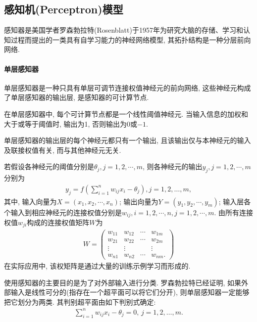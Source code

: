 \subsection{感知机(Perceptron)模型}
    感知器是美国学者罗森勃拉特(Rosenblatt)于1957年为研究大脑的存储、学习和认知过程而提出的一类具有自学习能力的神经网络模型, 其拓扑结构是一种分层前向网络.
\paragraph{单层感知器}
单层感知器是一种只具有单层可调节连接权值神经元的前向网络, 这些神经元构成了单层感知器的输出层, 是感知器的可计算节点.

在单层感知器中, 每个可计算节点都是一个线性阈值神经元. 当输入信息的加权和大于或等于阈值时, 输出为1, 否则输出为0或$-1$.

单层感知器的输出层的每个神经元都只有一个输出, 且该输出仅与本神经元的输入及联接权值有关, 而与其他神经元无关.

若假设各神经元的阈值分别是$\theta_j, j=1,2,\cdots,m$, 则各神经元的输出$y_j, j=1,2,\cdots,m$分别为
\begin{align}
    {y}_{{j}}={f}\left(\sum_{{i}=1}^{{n}} w_{{ij}} {x}_{{i}}-\theta_{{j}}\right), {j}=1,2, \ldots, {m},
\end{align}
其中, 输入向量为$X=(x_1,x_2,\cdots,x_n)$; 输出向量为$Y=(y_1,y_2,\cdots,y_m)$;
输入层各个输入到相应神经元的连接权值分别是$w_{ij},i=1,2,\cdots,n, j=1,2,\cdots, m$. 由所有连接权值$w_{ji}$构成的连接权值矩阵$W$为
\begin{align}
W=\left(
\begin{array}{llll}
{w_{11}} & {w_{12}} & \cdots          &w_{1 {m}} \\
{w_{21}} & {w_{22}} & \cdots         &w_{2 {m}} \\
{\vdots} & {\vdots} &                &\vdots\\
{w_{{n} 1}} & {w_{{n} 2}} & {\cdots} & {w_{{nm}}}.
\end{array}
\right)
\end{align}
在实际应用中, 该权矩阵是通过大量的训练示例学习而形成的.

使用感知器的主要目的是为了对外部输入进行分类. 罗森勃拉特已经证明, 如果外部输入是线性可分的(指存在一个超平面可以将它们分开), 则单层感知器一定能够把它划分为两类. 其判别超平面由如下判别式确定:
\begin{align}
    \sum_{i=1}^{n} w_{i j} x_{i}-\theta_{j}=0,\,j=1,2, \ldots, m.
\end{align}

